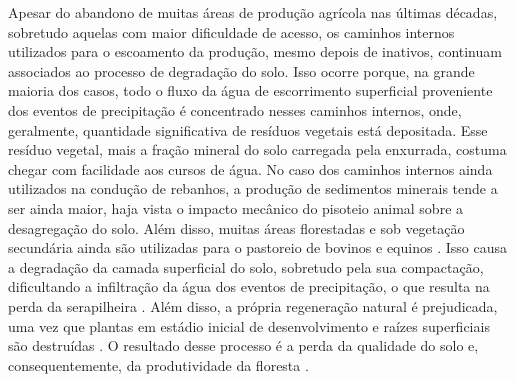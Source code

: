 
Apesar do abandono de muitas áreas de produção agrícola nas últimas décadas, sobretudo aquelas com maior 
dificuldade de acesso, os caminhos internos utilizados para o escoamento da produção, mesmo depois de 
inativos, continuam associados ao processo de degradação do solo. Isso ocorre porque, na grande maioria dos 
casos, todo o fluxo da água de escorrimento superficial proveniente dos eventos de precipitação é concentrado 
nesses caminhos internos, onde, geralmente, quantidade significativa de resíduos vegetais está depositada. 
Esse resíduo vegetal, mais a fração mineral do solo carregada pela enxurrada, costuma chegar com facilidade 
aos cursos de água. No caso dos caminhos internos ainda utilizados na condução de rebanhos, a produção de 
sedimentos minerais tende a ser ainda maior, haja vista o impacto mecânico do pisoteio animal sobre a 
desagregação do solo. Além disso, muitas áreas florestadas e sob vegetação secundária ainda são utilizadas 
para o pastoreio de bovinos e equinos \cite{SamuelRosaEtAl2011a}. Isso causa a degradação da camada superficial 
do solo, sobretudo pela sua compactação, dificultando a infiltração da água dos eventos de precipitação, o que 
resulta na perda da serapilheira \cite{ScheneiderEtAl1978}. Além disso, a própria regeneração natural é 
prejudicada, uma vez que plantas em estádio inicial de desenvolvimento e raízes superficiais são destruídas 
\cite{ScheneiderEtAl1978, HackEtAl2005}. O resultado desse processo é a perda da qualidade do solo e, 
consequentemente, da produtividade da floresta \cite{KonigEtAl2002}.


